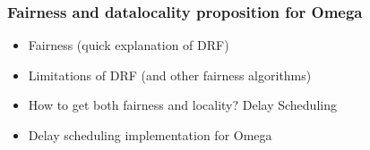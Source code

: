 \documentclass[notes]{beamer}
\begin{document}
  \note{}

  \begin{frame}
    \frametitle{Fairness and datalocality proposition for Omega}
    \begin{itemize}
      \item Fairness (quick explanation of DRF)
      \item Limitations of DRF (and other fairness algorithms)
      \item How to get both fairness and locality? Delay Scheduling
      \item Delay scheduling implementation for Omega
    \end{itemize}
  \end{frame}

  \note{}
\end{document}
